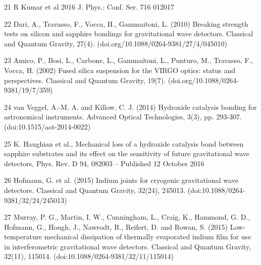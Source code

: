 21 R Kumar et al 2016 J. Phys.: Conf. Ser. 716 012017

22 Dari, A., Travasso, F., Vocca, H., Gammaitoni, L. (2010) Breaking strength tests on silicon and sapphire bondings for gravitational wave detectors. Classical and Quantum Gravity, 27(4). (doi.org/10.1088/0264-9381/27/4/045010)

23 Amico, P., Bosi, L., Carbone, L., Gammaitoni, L., Punturo, M., Travasso, F., Vocca, H. (2002) Fused silica suspension for the VIRGO optics: status and perspectives. Classical and Quantum Gravity, 19(7). (doi.org/10.1088/0264-9381/19/7/359)

24 van Veggel, A.-M. A. and Killow, C. J. (2014) Hydroxide catalysis bonding for astronomical instruments. Advanced Optical Technologies, 3(3), pp. 293-307. (doi:10.1515/aot-2014-0022)

25 K. Haughian et al., Mechanical loss of a hydroxide catalysis bond between sapphire substrates and its effect on the sensitivity of future gravitational wave detectors, Phys. Rev. D 94, 082003 – Published 12 October 2016

26 Hofmann, G. et al. (2015) Indium joints for cryogenic gravitational wave detectors. Classical and Quantum Gravity, 32(24), 245013. (doi:10.1088/0264-9381/32/24/245013)

27 Murray, P. G., Martin, I. W., Cunningham, L., Craig, K., Hammond, G. D., Hofmann, G., Hough, J., Nawrodt, R., Reifert, D. and Rowan, S. (2015) Low-temperature mechanical dissipation of thermally evaporated indium film for use in interferometric gravitational wave detectors. Classical and Quantum Gravity, 32(11), 115014. (doi:10.1088/0264-9381/32/11/115014)



